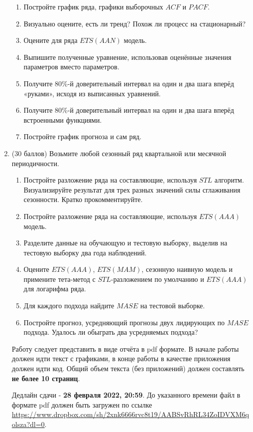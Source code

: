 \documentclass[12pt]{article}
\begin{document}
\begin{enumerate}
\begin{enumerate}
    \item Постройте график ряда, графики выборочных $ACF$ и $PACF$.
    \item Визуально оцените, есть ли тренд? Похож ли процесс на стационарный?
    \item Оцените для ряда $ETS(AAN)$ модель. 
    \item Выпишите полученные уравнение, использовав оценённые значения параметров вместо параметров.
    \item Получите 80\%-й доверительный интервал на один и два шага вперёд «руками», исходя из выписанных уравнений. 
    \item Получите 80\%-й доверительный интервал на один и два шага вперёд встроенными функциями.
    \item Постройте график прогноза и сам ряд. 
\end{enumerate}

\newpage

\item  (30 баллов) Возьмите любой сезонный ряд квартальной или месячной периодичности. 

\begin{enumerate}
    \item Постройте разложение ряда на составляющие, используя $STL$ алгоритм. 
    Визуализируйте результат для трех разных значений силы сглаживания сезонности. Кратко прокомментируйте.
    
    \item Постройте разложение ряда на составляющие, используя $ETS(AAA)$ модель. 
    
    \item Разделите данные на обучающую и тестовую выборку, выделив на тестовую выборку два года наблюдений. 
    
    \item Оцените $ETS(AAA)$, $ETS(MAM)$, сезонную наивную модель и примените тета-метод с $STL$-разложением по умолчанию и $ETS(AAA)$ для логарифма ряда. 
    
    \item Для каждого подхода найдите $MASE$ на тестовой выборке.
    
    \item Постройте прогноз, усредняющий прогнозы двух лидирующих по $MASE$ подхода. Удалось ли обыграть два усредняемых подхода?
    
\end{enumerate}



Работу следует представить в виде отчёта в pdf формате. 
В начале работы должен идти текст с графиками, в конце работы в качестве приложения должен идти код. 
Общий объем текста (без приложений) должен составлять \textbf{не более 10 страниц}.

Дедлайн сдачи - \textbf{28 февраля 2022, 20:59}. До указанного времени файл в формате pdf должен быть загружен по ссылке
\url{https://www.dropbox.com/sh/2xnk6666rvc8t19/AABSvRhRL34ZoIDVXM6qolsza?dl=0}.

\end{enumerate}
\end{document}
